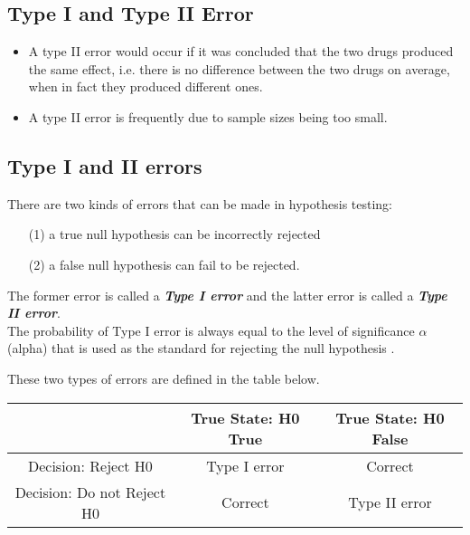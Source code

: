 \documentclass[]{report}
\begin{document}





\subsection{Type I and Type II Error}
\begin{itemize}

\item A type II error would occur if it was concluded that the two drugs produced the same effect, i.e. there is no difference between the two drugs on average, when in fact they produced different ones.
\item A type II error is frequently due to sample sizes being too small.
\end{itemize}



\subsection{Type I and II errors}

There are two kinds of errors that can be made in hypothesis testing:
\begin{itemize}
\item[(1)] a true null hypothesis can be incorrectly rejected
\item[(2)] a false null hypothesis can fail to be rejected.
\end{itemize}
The former error is called a \textbf{\emph{Type I error}} and the latter error is called a \textbf{\emph{Type II error}}. \\ \bigskip
The probability of Type I error is always equal to the level of significance $\alpha$ (alpha) that is used as the standard for rejecting the null hypothesis .







These two types of errors are defined in the table below.

\begin{center}
\begin{tabular}{|c|c|c|}
\hline
&True State: H0 True& True State: H0 False\\\hline
Decision: Reject H0& Type I error&Correct\\
Decision: Do not Reject H0& Correct &Type II error\\ \hline
\end{tabular}
\end{center}
\end{document}
